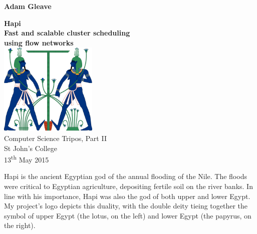 \documentclass[12pt,a4paper,twoside,notitlepage]{report}
\theoremstyle{plain}
\theoremstyle{definition}
\theoremstyle{remark}
\begin{document}

\nocite{*}                      %

\pagestyle{empty}

\hfill{\large \bf Adam Gleave}

\vspace*{30mm}


\begin{center}
    {\fontsize{36pt}{1em}\selectfont \textbf{Hapi}} \\
    \large
    \vspace*{2mm}
    \textbf{Fast and scalable cluster scheduling \\ using flow networks} \\
   	\vspace*{10mm}
    \includegraphics[width=0.35\textwidth]{logo/Hapy_tying} \\
	\vspace*{10mm}
	Computer Science Tripos, Part II \\
	\vspace*{5mm}
	St John's College \\
	\vspace*{5mm}
    13\textsuperscript{th} May 2015
\end{center}
\clearpage
\vspace*{\fill}

Hapi is the ancient Egyptian god of the annual flooding of the Nile. The floods were critical to Egyptian agriculture, depositing fertile soil on the river banks. In line with his importance, Hapi was also the god of both upper and lower Egypt. My project's logo depicts this duality, with the double deity tieing together the symbol of upper Egypt (the lotus, on the left) and lower Egypt (the papyrus, on the right).
\end{document}
